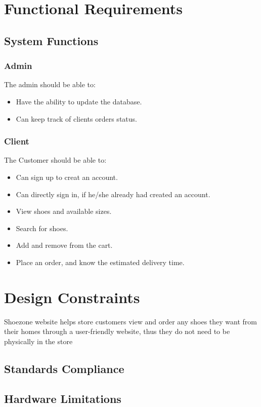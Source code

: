 \documentclass[12pt]{article}
\begin{document}
\section{Functional Requirements}
\subsection{System Functions}\label{System Functions}
\subsubsection{Admin}
The admin should be able to:
\begin{itemize}
\item Have the ability to update the database.
\item Can keep track of clients orders status.
\end{itemize}
\subsubsection{Client}
The Customer should be able to:
\begin{itemize}
\item Can sign up to creat an account.
\item Can directly sign in, if he/she already had created an account.
\item View shoes and available sizes.
\item Search for shoes.
\item Add and remove from the cart.
\item Place an order, and know the estimated delivery time.
\end{itemize}
\section{Design Constraints}
Shoezone website helps store customers view and order any shoes they want from their homes through a user-friendly website, thus they do not need to be physically in the store 

\subsection{ Standards Compliance}

\subsection{ Hardware Limitations}
\end{document}
